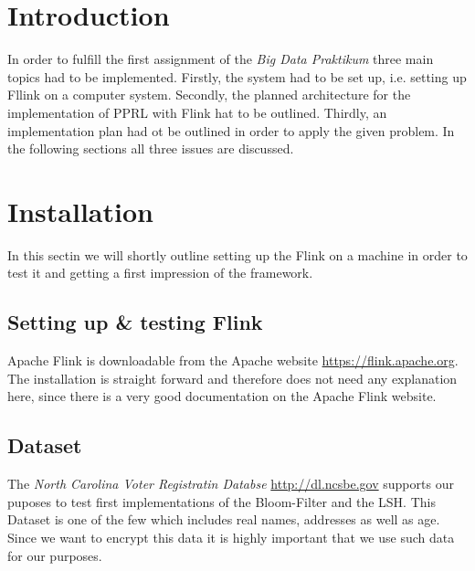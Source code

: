 \documentclass[10pt]{article}
\begin{document}
    

    \section{Introduction}

        In order to fulfill the first assignment of the \textit{Big Data Praktikum} three main topics had to be
        implemented. Firstly, the system had to be set up, i.e. setting up Fllink on a computer system. Secondly,
        the planned architecture for the implementation of PPRL with Flink hat to be outlined. Thirdly, an
        implementation plan had ot be outlined in order to apply the given problem.
        In the following sections all three issues are discussed.

    \section{Installation}

        In this sectin we will shortly outline setting up the Flink on a machine in order to test it and
        getting a first impression of the framework.

        \subsection{Setting up \& testing Flink}

            Apache Flink is downloadable from the Apache website \url{https://flink.apache.org}. The installation
            is straight forward and therefore does not need any explanation here, since there is a very good
            documentation on the Apache Flink website.


        \subsection{Dataset}


            The \textit{North Carolina Voter Registratin Databse} \url{http://dl.ncsbe.gov}
            supports our puposes to test
            first implementations of the Bloom-Filter and the LSH. This Dataset is one of the few
            which includes real names, addresses as well as age. Since we want to encrypt this data
            it is highly important that we use such data for our purposes.
\end{document}

